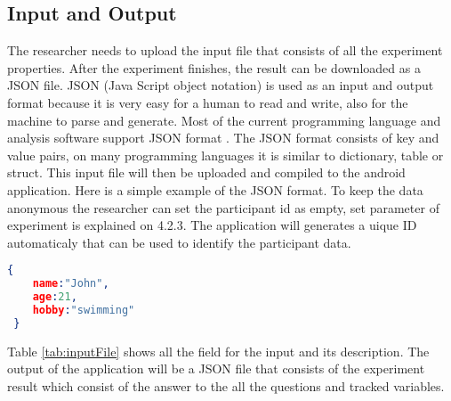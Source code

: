 \subsection{Input and Output}


The researcher needs to upload the input file that consists of all the experiment properties. After the experiment finishes, the result can be downloaded as a JSON file.
JSON (Java Script object notation) is used as an input and output format because it is very easy for a human to read and write, also for the machine to parse and generate.
Most of the current programming language and analysis software support JSON format \citep{jsonDesc}.
The JSON format consists of key and value pairs, on many programming languages it is similar to dictionary, table or struct. This input file will then be uploaded and compiled to the android application.
Here is a simple example of the JSON format.
To keep the data anonymous the researcher can set the participant id as empty, set parameter of experiment is explained on 4.2.3.
The application will generates a uique ID automaticaly that can be used
to identify the participant data.
\begin{lstlisting}[language=json,firstnumber=1]
 {
    name:"John",
    age:21,
    hobby:"swimming"
 }
\end{lstlisting}
Table \ref{tab:inputFile} shows all the field for the input and its description. The output of the application will be a JSON file that consists of the experiment result
which consist of the answer to the all the questions and tracked variables.

